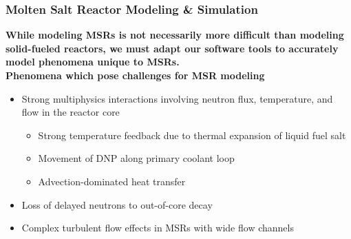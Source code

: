 \begin{frame}
  \frametitle{Molten Salt Reactor Modeling \& Simulation}
  \textbf{While modeling MSRs is not necessarily more difficult than modeling solid-fueled
  reactors, we must adapt our software tools to accurately model phenomena unique to MSRs.}\\

  \textbf{Phenomena which pose challenges for MSR modeling}
  \begin{itemize}
	\item Strong multiphysics interactions involving neutron flux, temperature, and flow in the
      reactor core
	  \begin{itemize}
		\item Strong temperature feedback due to thermal expansion of liquid fuel salt
		\item Movement of \gls{DNP} along primary coolant loop
        \item Advection-dominated heat transfer
	  \end{itemize}
    \item Loss of delayed neutrons to out-of-core decay
    \item Complex turbulent flow effects in MSRs with wide flow channels
  \end{itemize}
\end{frame}

